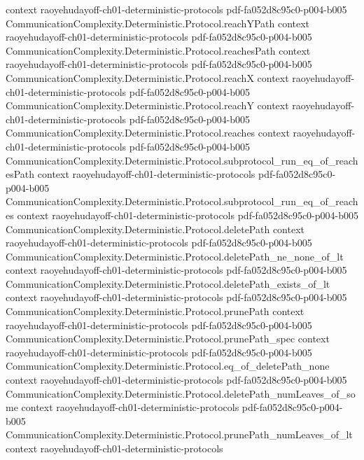 \begin{theorem}
  {context}
  {raoyehudayoff-ch01-deterministic-protocols}
  {pdf-fa052d8c95c0-p004-b005}
\proofstep
  {CommunicationComplexity.Deterministic.Protocol.reachYPath}
  {context}
  {raoyehudayoff-ch01-deterministic-protocols}
  {pdf-fa052d8c95c0-p004-b005}
\proofstep
  {CommunicationComplexity.Deterministic.Protocol.reachesPath}
  {context}
  {raoyehudayoff-ch01-deterministic-protocols}
  {pdf-fa052d8c95c0-p004-b005}
\proofstep
  {CommunicationComplexity.Deterministic.Protocol.reachX}
  {context}
  {raoyehudayoff-ch01-deterministic-protocols}
  {pdf-fa052d8c95c0-p004-b005}
\proofstep
  {CommunicationComplexity.Deterministic.Protocol.reachY}
  {context}
  {raoyehudayoff-ch01-deterministic-protocols}
  {pdf-fa052d8c95c0-p004-b005}
\proofstep
  {CommunicationComplexity.Deterministic.Protocol.reaches}
  {context}
  {raoyehudayoff-ch01-deterministic-protocols}
  {pdf-fa052d8c95c0-p004-b005}
\proofstep
  {CommunicationComplexity.Deterministic.Protocol.subprotocol_run_eq_of_reachesPath}
  {context}
  {raoyehudayoff-ch01-deterministic-protocols}
  {pdf-fa052d8c95c0-p004-b005}
\proofstep
  {CommunicationComplexity.Deterministic.Protocol.subprotocol_run_eq_of_reaches}
  {context}
  {raoyehudayoff-ch01-deterministic-protocols}
  {pdf-fa052d8c95c0-p004-b005}
\proofstep
  {CommunicationComplexity.Deterministic.Protocol.deletePath}
  {context}
  {raoyehudayoff-ch01-deterministic-protocols}
  {pdf-fa052d8c95c0-p004-b005}
\proofstep
  {CommunicationComplexity.Deterministic.Protocol.deletePath_ne_none_of_lt}
  {context}
  {raoyehudayoff-ch01-deterministic-protocols}
  {pdf-fa052d8c95c0-p004-b005}
\proofstep
  {CommunicationComplexity.Deterministic.Protocol.deletePath_exists_of_lt}
  {context}
  {raoyehudayoff-ch01-deterministic-protocols}
  {pdf-fa052d8c95c0-p004-b005}
\proofstep
  {CommunicationComplexity.Deterministic.Protocol.prunePath}
  {context}
  {raoyehudayoff-ch01-deterministic-protocols}
  {pdf-fa052d8c95c0-p004-b005}
\proofstep
  {CommunicationComplexity.Deterministic.Protocol.prunePath_spec}
  {context}
  {raoyehudayoff-ch01-deterministic-protocols}
  {pdf-fa052d8c95c0-p004-b005}
\proofstep
  {CommunicationComplexity.Deterministic.Protocol.eq_of_deletePath_none}
  {context}
  {raoyehudayoff-ch01-deterministic-protocols}
  {pdf-fa052d8c95c0-p004-b005}
\proofstep
  {CommunicationComplexity.Deterministic.Protocol.deletePath_numLeaves_of_some}
  {context}
  {raoyehudayoff-ch01-deterministic-protocols}
  {pdf-fa052d8c95c0-p004-b005}
\proofstep
  {CommunicationComplexity.Deterministic.Protocol.prunePath_numLeaves_of_lt}
  {context}
  {raoyehudayoff-ch01-deterministic-protocols}

\end{theorem}
